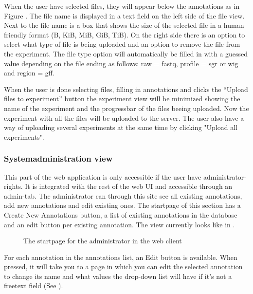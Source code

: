 When the user have selected files, they will appear below the annotations as in Figure . The file name is displayed in a text field on the left side of the file view. Next to the file name is a box that shows the size of the selected file in a human friendly format (B, KiB, MiB, GiB, TiB). On the right side there is an option to select what type of file is being uploaded and an option to remove the file from the experiment. The file type option will automatically be filled in with a guessed value depending on the file ending as follows: raw = fastq, profile = sgr or wig and region = gff.

When the user is done selecting files, filling in annotations and clicks the “Upload files to experiment” button the experiment view will be minimized showing the name of the experiment and the progressbar of the files beeing uploaded. Now the experiment with all the files will be uploaded to the server. The user also have a way of uploading several experiments at the same time by clicking "Upload all experiments". 

\subsubsection{Systemadministration view}

This part of the web application is only accessible if the user have administrator-rights. It is integrated with the rest of the web UI and accessible through an admin-tab. The administrator can through this site see all existing annotations, add new annotations and edit existing ones.
The startpage of this section has a Create New Annotations button, a list of existing annotations in the database and an edit button per existing annotation. 
The view currently looks like in . 

\begin{figure}[h]
 \caption{The startpage for the administrator in the web client}
 \label{adm__web_annotationView}
\end{figure}

For each annotation in the annotations list, an Edit button is available. 
When pressed, it will take you to a page in which you can edit the selected annotation to change its name and what values the drop-down list will have if it's not a freetext field (See ). 

